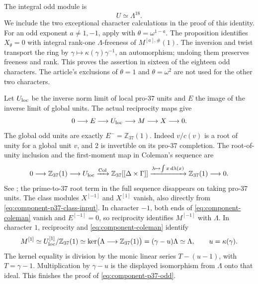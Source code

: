 The integral odd module is
\begin{equation}\label{eq:component-p37-odd}
 U\simeq\Lambda^{18}.
\end{equation}
We include the two exceptional character calculations in the proof
of this identity.  For an odd exponent $a\ne1,-1$, apply
\cite[Proposition~2.2.6]{WWEOrd} with
$\theta=\omega^{1-a}$.  The proposition identifies $X_\theta=0$
with integral rank-one $\Lambda$-freeness of
$M^{[a],\#}(1)$.  The inversion and twist transport the ring by
$\gamma\mapsto\kappa(\gamma)\gamma^{-1}$, an automorphism; undoing
them preserves freeness and rank.  This proves the assertion in
sixteen of the eighteen odd characters.  The article's exclusions
of $\theta=1$ and $\theta=\omega^2$ are not used for the other
two characters.

Let $U_{\rm loc}$ be the inverse norm limit of local pro-$37$ units
and $E$ the image of the inverse limit of global units.  The actual
reciprocity maps give
\[
 0\longrightarrow E\longrightarrow U_{\rm loc}
 \longrightarrow M\longrightarrow X\longrightarrow0.
\]
The global odd units are exactly $E^-=\mathbb Z_{37}(1)$.
Indeed $v/c(v)$ is a root of unity for a global unit $v$, and
$2$ is invertible on its pro-$37$ completion.  The root-of-unity
inclusion and the first-moment map in Coleman's sequence are
\begin{equation}\label{eq:component-coleman}
 0\longrightarrow\mathbb Z_{37}(1)\longrightarrow U_{\rm loc}
 \xrightarrow{\operatorname{Col}}
 \mathbb Z_{37}[[\Delta\times\Gamma]]
 \xrightarrow{\lambda\mapsto\int x\,d\lambda(x)}
 \mathbb Z_{37}(1)\longrightarrow0.
\end{equation}
See \cite[Theorem~5.5.31]{SharifiIwa}; the prime-to-$37$
root term in the full sequence disappears on taking pro-$37$
units.  The class modules $X^{[-1]}$ and $X^{[1]}$ vanish, also
directly from \eqref{eq:component-p37-class-input}.  In character
$-1$, both ends of \eqref{eq:component-coleman} vanish and $E^{[-1]}=0$,
so reciprocity identifies $M^{[-1]}$ with $\Lambda$.  In character
$1$, reciprocity and \eqref{eq:component-coleman} identify
\[
 M^{[1]}\simeq U_{\rm loc}^{[1]}/\mathbb Z_{37}(1)
 \simeq\ker\bigl(\Lambda\longrightarrow\mathbb Z_{37}(1)\bigr)
 =(\gamma-u)\Lambda\simeq\Lambda,
 \qquad u=\kappa(\gamma).
\]
The kernel equality is division by the monic linear series
$T-(u-1)$, with $T=\gamma-1$.  Multiplication by $\gamma-u$ is
the displayed isomorphism from $\Lambda$ onto that ideal.  This
finishes the proof of \eqref{eq:component-p37-odd}.

